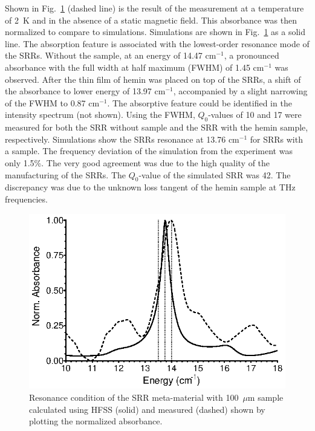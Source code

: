 Shown in Fig.~\ref{ch3-fig:resonator} (dashed line) is the result of the measurement at a temperature of 2~K and in the absence of a static magnetic field. This absorbance was then normalized to compare to simulations. Simulations are shown in Fig.~\ref{ch3-fig:resonator} as a solid line. The absorption feature is associated with the lowest-order resonance mode of the SRRs. \cite{Katsarakis04} Without the sample, at an energy of 14.47 cm$^{-1}$, a pronounced absorbance with the full width at half maximum (FWHM) of 1.45 cm$^{-1}$ was observed. After the thin film of hemin was placed on top of the SRRs, a shift of the absorbance to lower energy of 13.97 cm$^{-1}$, accompanied by a slight narrowing of the FWHM to 0.87 cm$^{-1}$. The absorptive feature could be identified in the intensity spectrum (not shown). Using the FWHM, $Q_0$-values of 10 and 17 were measured for both the SRR without sample and the SRR with the hemin sample, respectively. Simulations show the SRRs resonance at 13.76 cm$^{-1}$ for SRRs with a sample. The frequency deviation of the simulation from the experiment was only 1.5\%. The very good agreement was due to the high quality of the manufacturing of the SRRs. The $Q_0$-value of the simulated SRR was 42. The discrepancy was due to the unknown loss tangent of the hemin sample at THz frequencies.


\begin{figure}[htp]\centering
  \includegraphics{Kapitel/Ch3-Images/03-SRR_Profile.eps}%
  \caption[Simulated and measured SRR resonance.]{Resonance condition of the SRR meta-material with 100~$\mu$m sample calculated using HFSS (solid) and measured (dashed) shown by plotting the normalized absorbance.}
  \label{ch3-fig:resonator}
\end{figure}

